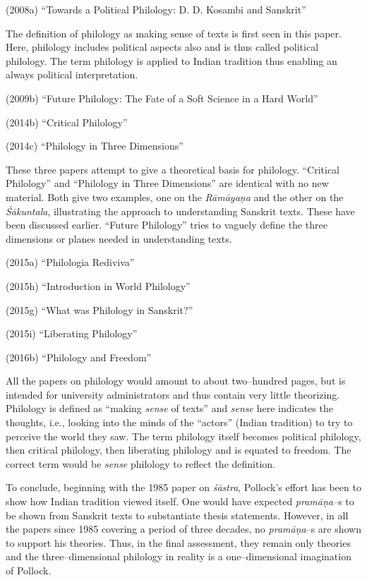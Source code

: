 (2008a) “Towards a Political Philology: D. D. Kosambi and Sanskrit”

The definition of philology as making sense of texts is first seen in this paper. Here, philology includes political aspects also and is thus called political philology. The term philology is applied to Indian tradition thus enabling an always political interpretation.

\item (2009b) “Future Philology: The Fate of a Soft Science in a Hard World”

 \item (2014b) “Critical Philology”

 \item (2014c) “Philology in Three Dimensions”

These three papers attempt to give a theoretical basis for philology. “Critical Philology” and “Philology in Three Dimensions” are identical with no new material. Both give two examples, one on the \textit{Rāmāyaṇa} and the other on the \textit{Śākuntala}, illustrating the approach to understanding Sanskrit texts. These have been discussed earlier. “Future Philology” tries to vaguely define the three dimensions or planes needed in understanding texts.

\item (2015a) “Philologia Rediviva”

 \item (2015h) “Introduction in World Philology”

 \item (2015g) “What was Philology in Sanskrit?”

 \item (2015i) “Liberating Philology”

 \item (2016b) “Philology and Freedom”

All the papers on philology would amount to about two–hundred pages, but is intended for university administrators and thus contain very little theorizing. Philology is defined as “making \textit{sense} of texts” and \textit{sense} here indicates the thoughts, i.e., looking into the minds of the “actors” (Indian tradition) to try to perceive the world they saw. The term philology itself becomes political philology, then critical philology, then liberating philology and is equated to freedom. The correct term would be \textit{sense} philology to reflect the definition.

To conclude, beginning with the 1985 paper on \textit{śāstra}, Pollock’s effort has been to show how Indian tradition viewed itself. One would have expected \textit{pramāṇa–}s to be shown from Sanskrit texts to substantiate thesis statements. However, in all the papers since 1985 covering a period of three decades, no \textit{pramāṇa}–s are shown to support his theories. Thus, in the final assessment, they remain only theories and the three–dimensional philology in reality is a one–dimensional imagination of Pollock.

